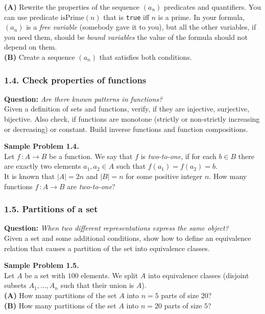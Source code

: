 \documentclass[jou]{apa6}
\begin{document}
{\bf (A)} Rewrite the properties of the sequence $(a_n)$ predicates and quantifiers. 
You can use predicate $\text{isPrime}(n)$ that is {\tt true} iff $n$ is a prime. 
In your formula, $(a_n)$ is a {\em free variable} (somebody gave it to you), 
but all the other variables, if you need them,
should be {\em bound variables} \textendash{} the value of the formula should not depend on them.\\
{\bf (B)} Create a sequence $(a_n)$ that satisfies both conditions.






\subsubsection{1.4. Check properties of functions}

{\bf Question:} {\em Are there known patterns in functions?}\\
{\scriptsize 
Given a definition of sets and functions, verify, if they are injective, 
surjective, bijective. Also check, if functions are monotone 
(strictly or non-strictly increasing or decreasing) or constant. 
Build inverse functions and function compositions.
}

\vspace{6pt}
{\bf Sample Problem 1.4.}\\
Let $f\,:A \rightarrow B$ be a function. We say that $f$ is {\em two-to-one}, if for
each $b \in B$ there are exactly two elements $a_1,a_2 \in A$ such that 
$f(a_1)=f(a_2) = b$.\\
It is known that $|A| = 2n$ and $|B| = n$ for some positive integer $n$. 
How many functions $f\,:A \rightarrow B$ are {\em two-to-one}?

\subsubsection{1.5. Partitions of a set} 

{\bf Question:} {\em When two different representations express the same object?}\\
{\scriptsize 
Given a set and some additional conditions, show how to define an equivalence 
relation that causes a partition of the set into equivalence classes. 
}


\vspace{6pt}
{\bf Sample Problem 1.5.}\\
Let $A$ be a set with $100$ elements. We split $A$ into equivalence classes
(disjoint subsets $A_1,\ldots,A_n$ such that their union is $A$).\\
{\bf (A)} How many partitions of the set $A$ into $n=5$ parts of size $20$?\\
{\bf (B)} How many partitions of the set $A$ into $n=20$ parts of size $5$?\\
\end{document}
